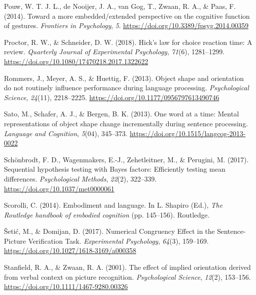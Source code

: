 \documentclass[
  man,floatsintext]{apa7}
\newlength{\cslhangindent}
\newlength{\cslentryspacingunit} %
\newenvironment{CSLReferences}[2] %
 {%
  \setlength{\parindent}{0pt}
  \ifodd #1
  \let\oldpar\par
  \def\par{\hangindent=\cslhangindent\oldpar}
  \fi
  \setlength{\parskip}{#2\cslentryspacingunit}
 }%
 {}
\begin{document}
\begin{CSLReferences}{1}{0}
\leavevmode{}%
Pouw, W. T. J. L., de Nooijer, J. A., van Gog, T., Zwaan, R. A., \& Paas, F. (2014). Toward a more embedded/extended perspective on the cognitive function of gestures. \emph{Frontiers in Psychology}, \emph{5}. \url{https://doi.org/10.3389/fpsyg.2014.00359}

\leavevmode{}%
Proctor, R. W., \& Schneider, D. W. (2018). Hick's law for choice reaction time: {A} review. \emph{Quarterly Journal of Experimental Psychology}, \emph{71}(6), 1281--1299. \url{https://doi.org/10.1080/17470218.2017.1322622}

\leavevmode{}%
Rommers, J., Meyer, A. S., \& Huettig, F. (2013). Object shape and orientation do not routinely influence performance during language processing. \emph{Psychological Science}, \emph{24}(11), 2218--2225. \url{https://doi.org/10.1177/0956797613490746}

\leavevmode{}%
Sato, M., Schafer, A. J., \& Bergen, B. K. (2013). One word at a time: {Mental} representations of object shape change incrementally during sentence processing. \emph{Language and Cognition}, \emph{5}(04), 345--373. \url{https://doi.org/10.1515/langcog-2013-0022}

\leavevmode{}%
Schönbrodt, F. D., Wagenmakers, E.-J., Zehetleitner, M., \& Perugini, M. (2017). Sequential hypothesis testing with {Bayes} factors: {Efficiently} testing mean differences. \emph{Psychological Methods}, \emph{22}(2), 322--339. \url{https://doi.org/10.1037/met0000061}

\leavevmode{}%
Scorolli, C. (2014). Embodiment and language. In L. Shapiro (Ed.), \emph{The {Routledge} handbook of embodied cognition} (pp. 145--156). {Routledge}.

\leavevmode{}%
Šetić, M., \& Domijan, D. (2017). Numerical {Congruency Effect} in the {Sentence-Picture Verification Task}. \emph{Experimental Psychology}, \emph{64}(3), 159--169. \url{https://doi.org/10.1027/1618-3169/a000358}

\leavevmode{}%
Stanfield, R. A., \& Zwaan, R. A. (2001). The effect of implied orientation derived from verbal context on picture recognition. \emph{Psychological Science}, \emph{12}(2), 153--156. \url{https://doi.org/10.1111/1467-9280.00326}


\end{CSLReferences}
\end{document}
